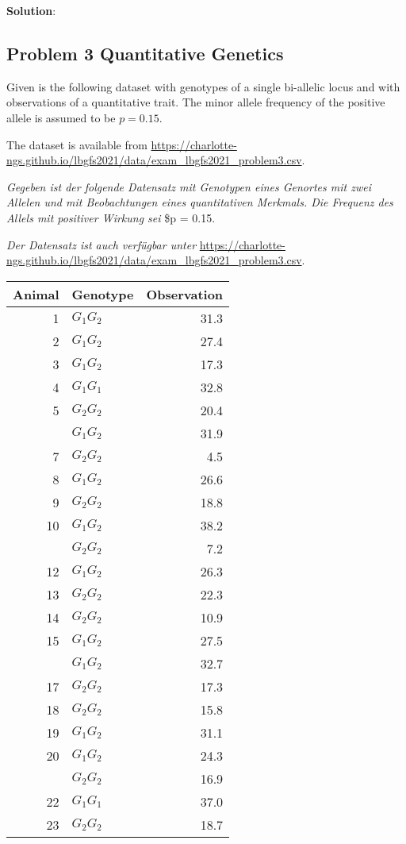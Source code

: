 \documentclass[
]{article}
\newcommand{\solstart}
{\vspace{3ex}\textbf{Solution}:}
\begin{document}
\vspace{3ex}
\solstart

\clearpage
\pagebreak

\hypertarget{problem-3-quantitative-genetics}{%
\subsection{Problem 3 Quantitative
Genetics}\label{problem-3-quantitative-genetics}}

Given is the following dataset with genotypes of a single bi-allelic
locus and with observations of a quantitative trait. The minor allele
frequency of the positive allele is assumed to be \(p = 0.15\).

The dataset is available from
\url{https://charlotte-ngs.github.io/lbgfs2021/data/exam_lbgfs2021_problem3.csv}.

\textit{Gegeben ist der folgende Datensatz mit Genotypen eines Genortes mit zwei Allelen und mit Beobachtungen eines quantitativen Merkmals. Die Frequenz des Allels mit positiver Wirkung sei}
\$p = 0.15.

\textit{Der Datensatz ist auch verfügbar unter }
\url{https://charlotte-ngs.github.io/lbgfs2021/data/exam_lbgfs2021_problem3.csv}.

\vspace{3ex}

\begin{tabular}{rlr}
\toprule
Animal & Genotype & Observation\\
\midrule
1 & $G_1G_2$ & 31.3\\
2 & $G_1G_2$ & 27.4\\
3 & $G_1G_2$ & 17.3\\
4 & $G_1G_1$ & 32.8\\
5 & $G_2G_2$ & 20.4\\
\addlinespace
6 & $G_1G_2$ & 31.9\\
7 & $G_2G_2$ & 4.5\\
8 & $G_1G_2$ & 26.6\\
9 & $G_2G_2$ & 18.8\\
10 & $G_1G_2$ & 38.2\\
\addlinespace
11 & $G_2G_2$ & 7.2\\
12 & $G_1G_2$ & 26.3\\
13 & $G_2G_2$ & 22.3\\
14 & $G_2G_2$ & 10.9\\
15 & $G_1G_2$ & 27.5\\
\addlinespace
16 & $G_1G_2$ & 32.7\\
17 & $G_2G_2$ & 17.3\\
18 & $G_2G_2$ & 15.8\\
19 & $G_1G_2$ & 31.1\\
20 & $G_1G_2$ & 24.3\\
\addlinespace
21 & $G_2G_2$ & 16.9\\
22 & $G_1G_1$ & 37.0\\
23 & $G_2G_2$ & 18.7\\
\bottomrule
\end{tabular}
\end{document}
